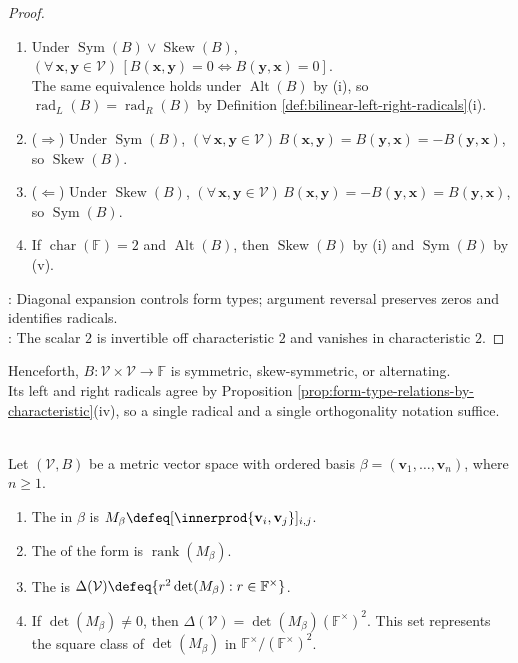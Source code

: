 \begin{proposition}
\begin{proof}
\begin{enumerate}[label=(\roman*)]
\item[$(iv)$] Under $\operatorname{Sym}(B)\vee\operatorname{Skew}(B)$, $(\forall\,\mathbf{x},\mathbf{y}\in\mathcal{V})\,[B(\mathbf{x},\mathbf{y})=0\Longleftrightarrow B(\mathbf{y},\mathbf{x})=0]$.\\
The same equivalence holds under $\operatorname{Alt}(B)$ by (i), so $\operatorname{rad}_{L}(B)=\operatorname{rad}_{R}(B)$ by Definition \ref{def:bilinear-left-right-radicals}(i).
\item[$(v)$] ($\Rightarrow$) Under $\operatorname{Sym}(B)$, $(\forall\,\mathbf{x},\mathbf{y}\in\mathcal{V})\,B(\mathbf{x},\mathbf{y})=B(\mathbf{y},\mathbf{x})=-B(\mathbf{y},\mathbf{x})$, so $\operatorname{Skew}(B)$.
\item[$(v)$] ($\Leftarrow$) Under $\operatorname{Skew}(B)$, $(\forall\,\mathbf{x},\mathbf{y}\in\mathcal{V})\,B(\mathbf{x},\mathbf{y})=-B(\mathbf{y},\mathbf{x})=B(\mathbf{y},\mathbf{x})$, so $\operatorname{Sym}(B)$.
\item[$(vi)$] If $\operatorname{char}(\mathbb{F})=2$ and $\operatorname{Alt}(B)$, then $\operatorname{Skew}(B)$ by (i) and $\operatorname{Sym}(B)$ by (v).
\end{enumerate}
: Diagonal expansion controls form types; argument reversal preserves zeros and identifies radicals.\\
: The scalar $2$ is invertible off characteristic $2$ and vanishes in characteristic $2$.
\end{proof}
\end{proposition}

Henceforth, $B:\mathcal{V}\times\mathcal{V}\to\mathbb{F}$ is symmetric, skew-symmetric, or alternating.\\
Its left and right radicals agree by Proposition \ref{prop:form-type-relations-by-characteristic}(iv), so a single radical and a single orthogonality notation suffice.

\begin{definition} \label{def:matrix-rank-and-discriminant-of-form} \\
Let $(\mathcal{V},B)$ be a metric vector space with ordered basis $\beta=(\mathbf{v}_1,\ldots,\mathbf{v}_n)$, where $n\geq1$.
\begin{enumerate}[label=(\roman*)]
\setlength{\itemsep}{0pt}
\item The  in $\beta$ is $M_{\beta}\defeq[\innerprod{\mathbf{v}_i,\mathbf{v}_j}]_{i,j}$.
\item The  of the form is $\operatorname{rank}(M_{\beta})$.
\item The  is $\Delta(\mathcal{V})\defeq\{r^2\det(M_{\beta}):r\in\mathbb{F}^{\times}\}$.
\item If $\det(M_{\beta})\neq0$, then $\Delta(\mathcal{V})=\det(M_\beta)(\mathbb{F}^{\times})^2$. This set represents the square class of $\det(M_\beta)$ in $\mathbb{F}^{\times}/(\mathbb{F}^{\times})^2$.
\end{enumerate}
\end{definition}

